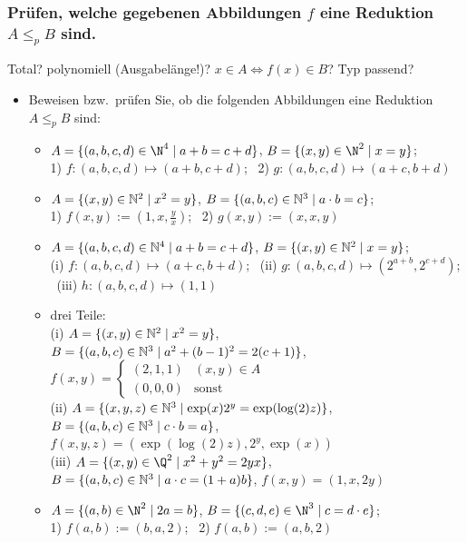 \subsubsection{Prüfen, welche gegebenen Abbildungen $f$ eine Reduktion $A\le_p B$ sind.}
Total? polynomiell (Ausgabelänge!)? $x\in A\Leftrightarrow f(x)\in B$? Typ passend?
\begin{itemize}
    \item Beweisen bzw.\ prüfen Sie, ob die folgenden Abbildungen eine Reduktion $A\le_p B$ sind:
    \begin{itemize}
        \item {} $A=\{(a,b,c,d)\in\N^4\mid a+b=c+d\}$, $B=\{(x,y)\in\N^2\mid x=y\}$;\\
        1) $f:(a,b,c,d)\mapsto(a+b,c+d)$; \ 2) $g:(a,b,c,d)\mapsto(a+c,b+d)$
        \item {} $A=\{(x,y)\in\mathbb{N}^2\mid x^2=y\}$, $B=\{(a,b,c)\in\mathbb{N}^3\mid a\cdot b=c\}$;\\
        1) $f(x,y):=(1,x,\tfrac{y}{x})$; \ 2) $g(x,y):=(x,x,y)$
        \item {} $A=\{(a,b,c,d)\in\mathbb{N}^4\mid a+b=c+d\}$, $B=\{(x,y)\in\mathbb{N}^2\mid x=y\}$;\\
        (i) $f:(a,b,c,d)\mapsto(a+c,b+d)$; \ (ii) $g:(a,b,c,d)\mapsto(2^{a+b},2^{c+d})$; \ (iii) $h:(a,b,c,d)\mapsto(1,1)$
        \item {} drei Teile:\\
        (i) $A=\{(x,y)\in\mathbb{N}^2\mid x^2=y\}$, $B=\{(a,b,c)\in\mathbb{N}^3\mid a^2+(b-1)^2=2(c+1)\}$,
        $f(x,y)=\begin{cases}(2,1,1)&(x,y)\in A\\(0,0,0)&\text{sonst}\end{cases}$\\
        (ii) $A=\{(x,y,z)\in\mathbb{N}^3\mid \exp(x)2^y=\exp(\log(2)z)\}$, $B=\{(a,b,c)\in\mathbb{N}^3\mid c\cdot b=a\}$,
        $f(x,y,z)=(\exp(\log(2)z),2^y,\exp(x))$\\
        (iii) $A=\{(x,y)\in\Q^2\mid x^2+y^2=2yx\}$, $B=\{(a,b,c)\in\mathbb{N}^3\mid a\cdot c=(1+a)b\}$, $f(x,y)=(1,x,2y)$
        \item {} $A=\{(a,b)\in\N^2\mid 2a=b\}$, $B=\{(c,d,e)\in\N^3\mid c=d\cdot e\}$;\\
        1) $f(a,b):=(b,a,2)$; \ 2) $f(a,b):=(a,b,2)$
    \end{itemize}
\end{itemize}

